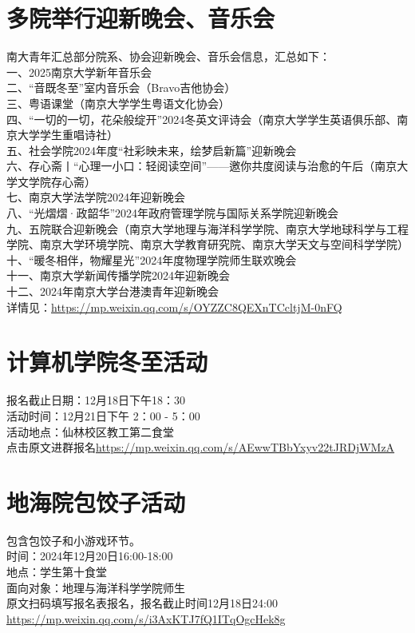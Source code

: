 \documentclass[letterpaper, 12pt]{article}
\begin{document}
\begin{multicols}{2}
\section{多院举行迎新晚会、音乐会}
南大青年汇总部分院系、协会迎新晚会、音乐会信息，汇总如下：\\
一、2025南京大学新年音乐会\\
二、“音既冬至”室内音乐会（Bravo吉他协会）\\
三、粤语课堂（南京大学学生粤语文化协会）\\
四、“一切的一切，花朵般绽开”2024冬英文评诗会（南京大学学生英语俱乐部、南京大学学生重唱诗社）\\
五、社会学院2024年度“社彩映未来，绘梦启新篇”迎新晚会\\
六、存心斋丨“心理一小口：轻阅读空间”——邀你共度阅读与治愈的午后（南京大学文学院存心斋）\\
七、南京大学法学院2024年迎新晚会\\
八、“光熠熠·政韶华”2024年政府管理学院与国际关系学院迎新晚会\\
九、五院联合迎新晚会（南京大学地理与海洋科学学院、南京大学地球科学与工程学院、南京大学环境学院、南京大学教育研究院、南京大学天文与空间科学学院）\\
十、“暖冬相伴，物耀星光”2024年度物理学院师生联欢晚会\\
十一、南京大学新闻传播学院2024年迎新晚会\\
十二、2024年南京大学台港澳青年迎新晚会\\
详情见：\url{https://mp.weixin.qq.com/s/OYZZC8QEXnTCcltjM-0nFQ}\\

\section{计算机学院冬至活动}
报名截止日期：12月18日下午18：30\\
活动时间：12月21日下午 2：00 - 5：00\\
活动地点：仙林校区教工第二食堂\\
点击原文进群报名\url{https://mp.weixin.qq.com/s/AEwwTBbYxyv22tJRDjWMzA}

\section{地海院包饺子活动}
包含包饺子和小游戏环节。\\
时间：2024年12月20日16:00-18:00\\
地点：学生第十食堂\\
面向对象：地理与海洋科学学院师生\\
原文扫码填写报名表报名，报名截止时间12月18日24:00\\
\url{https://mp.weixin.qq.com/s/i3AxKTJ7fQ1ITqOgcHek8g}


\end{multicols}
\end{document}
